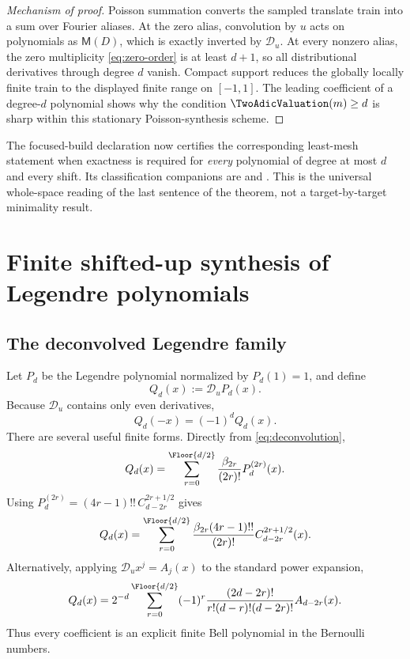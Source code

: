\documentclass[11pt,oneside]{article}
\numberwithin{equation}{section}
\theoremstyle{definition}
\theoremstyle{remark}
\newcommand{\MM}{\mathsf M}
\newcommand{\Dscr}{\mathscr D_u}
\begin{document}
\begin{proof}[Mechanism of proof]
Poisson summation converts the sampled translate train into a sum over Fourier
aliases.  At the zero alias, convolution by $u$ acts on polynomials as
$\MM(D)$, which is exactly inverted by $\Dscr$.  At every nonzero alias, the
zero multiplicity \eqref{eq:zero-order} is at least $d+1$, so all distributional
derivatives through degree $d$ vanish.  Compact support reduces the globally
locally finite train to the displayed finite range on $[-1,1]$.  The leading
coefficient of a degree-$d$ polynomial shows why the condition
$\TwoAdicValuation(m)\ge d$ is sharp within this stationary Poisson-synthesis scheme.
\end{proof}

The focused-build declaration  now
certifies the corresponding least-mesh statement when exactness is required
for \emph{every} polynomial of degree at most $d$ and every shift.  Its
classification companions are 
and .  This is the universal
whole-space reading of the last sentence of the theorem, not a
target-by-target minimality result.

\section{Finite shifted-up synthesis of Legendre polynomials}
\label{sec:legendre-synthesis}

\subsection{The deconvolved Legendre family}

Let $P_d$ be the Legendre polynomial normalized by $P_d(1)=1$, and define
\begin{equation}
 Q_d(x):=\Dscr P_d(x).
 \label{eq:Q-def}
\end{equation}
Because $\Dscr$ contains only even derivatives,
\begin{equation}
 Q_d(-x)=(-1)^dQ_d(x).
 \label{eq:Q-parity}
\end{equation}
There are several useful finite forms.  Directly from
\eqref{eq:deconvolution},
\begin{equation}
 Q_d(x)=\sum_{r=0}^{\Floor{d/2}}
 \frac{\beta_{2r}}{(2r)!}P_d^{(2r)}(x).
 \label{eq:Q-derivative}
\end{equation}
Using
$P_d^{(2r)}=(4r-1)!!\,C_{d-2r}^{2r+1/2}$ gives
\begin{equation}
 Q_d(x)=\sum_{r=0}^{\Floor{d/2}}
 \frac{\beta_{2r}(4r-1)!!}{(2r)!}
 C_{d-2r}^{2r+1/2}(x).
 \label{eq:Q-gegenbauer}
\end{equation}
Alternatively, applying $\Dscr x^j=A_j(x)$ to the standard power expansion,
\begin{equation}
 Q_d(x)=2^{-d}\sum_{r=0}^{\Floor{d/2}}(-1)^r
 \frac{(2d-2r)!}{r!(d-r)!(d-2r)!}A_{d-2r}(x).
 \label{eq:Q-appell}
\end{equation}
Thus every coefficient is an explicit finite Bell polynomial in the Bernoulli
numbers.
\end{document}

